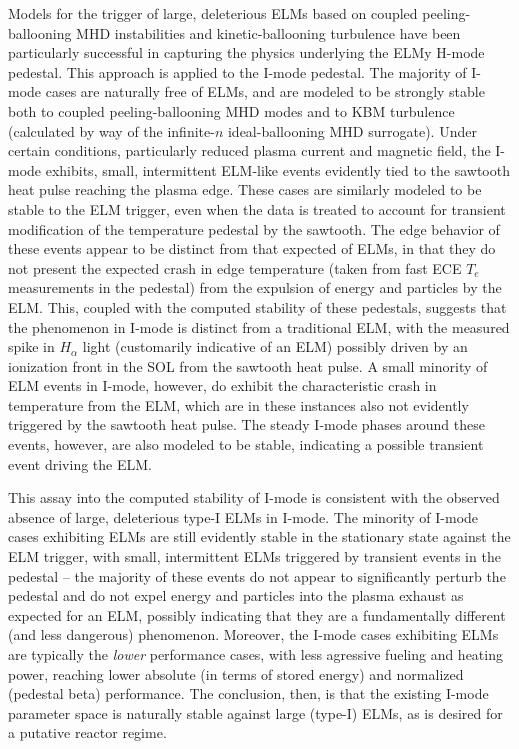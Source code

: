 Models for the trigger of large, deleterious ELMs based on coupled peeling-ballooning MHD instabilities \cite{Wilson2002,Snyder2003,Snyder2004,Wilson2006} and kinetic-ballooning turbulence \cite{Snyder1999,Candy2005,Snyder2001} have been particularly successful in capturing the physics underlying the ELMy H-mode pedestal.  This approach is applied to the I-mode pedestal.  The majority of I-mode cases are naturally free of ELMs, and are modeled to be strongly stable both to coupled peeling-ballooning MHD modes and to KBM turbulence (calculated by way of the infinite-$n$ ideal-ballooning MHD surrogate).  Under certain conditions, particularly reduced plasma current and magnetic field, the I-mode exhibits, small, intermittent ELM-like events evidently tied to the sawtooth heat pulse reaching the plasma edge.  These cases are similarly modeled to be stable to the ELM trigger, even when the data is treated to account for transient modification of the temperature pedestal by the sawtooth.  The edge behavior of these events appear to be distinct from that expected of ELMs, in that they do not present the expected crash in edge temperature (taken from fast ECE $T_e$ measurements in the pedestal) from the expulsion of energy and particles by the ELM.  This, coupled with the computed stability of these pedestals, suggests that the phenomenon in I-mode is distinct from a traditional ELM, with the measured spike in $H_\alpha$ light (customarily indicative of an ELM) possibly driven by an ionization front in the SOL from the sawtooth heat pulse.  A small minority of ELM events in I-mode, however, do exhibit the characteristic crash in temperature from the ELM, which are in these instances also not evidently triggered by the sawtooth heat pulse.  The steady I-mode phases around these events, however, are also modeled to be stable, indicating a possible transient event driving the ELM.

This assay into the computed stability of I-mode is consistent with the observed absence of large, deleterious type-I ELMs in I-mode.  The minority of I-mode cases exhibiting ELMs are still evidently stable in the stationary state against the ELM trigger, with small, intermittent ELMs triggered by transient events in the pedestal -- the majority of these events do not appear to significantly perturb the pedestal and do not expel energy and particles into the plasma exhaust as expected for an ELM, possibly indicating that they are a fundamentally different (and less dangerous) phenomenon.  Moreover, the I-mode cases exhibiting ELMs are typically the \emph{lower} performance cases, with less agressive fueling and heating power, reaching lower absolute (in terms of stored energy) and normalized (pedestal beta) performance.  The conclusion, then, is that the existing I-mode parameter space is naturally stable against large (type-I) ELMs, as is desired for a putative reactor regime.\nicechapterending{}


